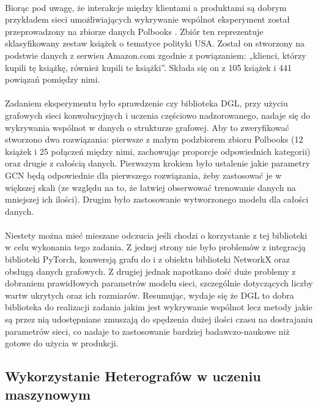\documentclass{article}
\begin{document}
\paragraph{}
Biorąc pod uwagę, że interakcje między klientami a produktami są dobrym przykładem sieci umożliwiających wykrywanie wspólnot eksperyment został przeprowadzony na zbiorze danych Polbooks \cite{polbooks}. Zbiór ten reprezentuje sklasyfikowany zestaw książek o tematyce polityki USA. Został on stworzony na podstwie danych z serwisu Amazon.com zgodnie z powiązaniem: „klienci, którzy kupili tę książkę, również kupili te książki”. Składa się on z 105 książek i 441 powiązań pomiędzy nimi. 

\paragraph{}
Zadaniem eksperymentu było sprawdzenie czy biblioteka DGL, przy użyciu grafowych sieci konwolucyjnych i uczenia częściowo nadzorowanego, nadaje się do wykrywania wspólnot w danych o strukturze grafowej. Aby to zweryfikować stworzono dwa rozwiązania: pierwsze z małym podzbiorem zbioru Polbooks (12 książek i 25 połączeń między nimi, zachowując proporcje odpowiednich kategorii) oraz drugie z całością danych. Pierwszym krokiem było ustalenie jakie parametry GCN będą odpowiednie dla pierwszego rozwiązania, żeby zastosować je w większej skali (ze względu na to, że łatwiej obserwować trenowanie danych na mniejszej ich ilości). Drugim było zastosowanie wytworzonego modelu dla całości danych.


\paragraph{}
Niestety można mieć mieszane odczucia jeśli chodzi o korzystanie z tej biblioteki w celu wykonania tego zadania.
Z jednej strony nie było problemów z integracją biblioteki PyTorch, konwersją grafu do i z obiektu biblioteki NetworkX oraz obsługą danych grafowych. Z drugiej jednak napotkano dość duże problemy z dobraniem prawidłowych parametrów modelu sieci, szczególnie dotyczących liczby wartw ukrytych oraz ich rozmiarów. Resumując, wydaje się że DGL to dobra biblioteka do realizacji zadania jakim jest wykrywanie wspólnot lecz metody jakie są przez nią udostępniane zmuszają do spędzenia dużej ilości czasu na dostrajaniu parametrów sieci, co nadaje to zastosowanie bardziej badawczo-naukowe niż gotowe do użycia w produkcji.

\subsection{Wykorzystanie Heterografów w uczeniu maszynowym}
\end{document}
